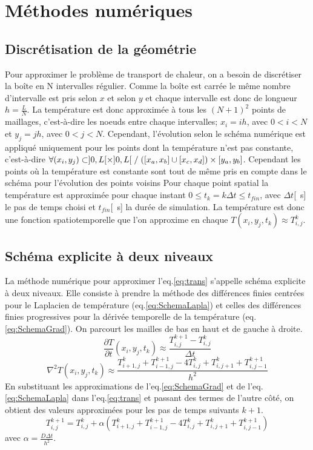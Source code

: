 \documentclass[a4paper,12pt,oneside]{article}
\def \be {\begin{equation}}
\def \ee {\end{equation}}
\begin{document}
\section{Méthodes numériques}
\subsection{Discrétisation de la géométrie}
Pour approximer le problème de transport de chaleur, on a besoin de discrétiser la boîte en N intervalles régulier. Comme la boîte est carrée le même nombre d'intervalle est pris selon $x$ et selon $y$ et chaque intervalle est donc de longueur $h=\frac{L}{N}$. La température est donc approximée à tous les $(N+1)^2$ points de maillages, c'est-à-dire les noeuds entre chaque intervalles; $x_i=ih$, avec $0<i<N$ et $y_j=jh$, avec $0<j<N$. Cependant, l'évolution selon le schéma numérique est appliqué uniquement pour les points dont la température n'est pas constante, c'est-à-dire 
$\forall (x_i,y_j)\subset ]0,L[\times]0,L[\hspace{0.1cm}/\hspace{0.1cm}([x_a,x_b]\cup[x_c,x_d])\times[y_a,y_b]$. Cependant les points où la température est constante sont tout de même pris en compte dans le schéma pour l'évolution des points voisins
Pour chaque point spatial la température est approximée pour chaque instant $0 \leq t_k=k \Delta t\leq t_{fin}$, avec $\Delta t$[\SI{}{s}] le pas de temps choisi et $t_{fin}$[\SI{}{s}] la durée de simulation.
La température est donc une fonction spatiotemporelle que l'on approxime en chaque $T(x_i,y_j,t_k)\approx T_{i,j}^{k}$.


\subsection{Schéma explicite à deux niveaux}
La méthode numérique pour approximer l'eq.\eqref{eq:trans} s'appelle schéma explicite à deux niveaux. Elle consiste à prendre la méthode des différences finies centrées pour le Laplacien de température (eq.\eqref{eq:SchemaLapla}) et celles des différences finies progressives pour la dérivée temporelle de la température (eq.\eqref{eq:SchemaGrad}). On parcourt les mailles de bas en haut et de gauche à droite.
\be
\frac{\partial T}{\partial t}(x_i,y_j,t_k)\approx\frac{T_{i,j}^{k+1}-T_{i,j}^{k}}{\Delta t}
\label{eq:SchemaGrad}
\ee
\be
\nabla^{2}T(x_i,y_j,t_k)\approx \frac{T_{i+1,j}^{k}+T_{i-1,j}^{k+1}-4T_{i,j}^{k}+T_{i,j+1}^{k}+T_{i,j-1}^{k+1}}{h^{2}}
\label{eq:SchemaLapla}
\ee
En substituant les approximations de l'eq.\eqref{eq:SchemaGrad} et de l'eq.\eqref{eq:SchemaLapla} dans l'eq.\eqref{eq:trans} et passant des termes de l'autre côté, on obtient des valeurs approximées pour les pas de temps suivants $k+1$.
\be
T_{i,j}^{k+1}=T_{i,j}^{k}+\alpha( {T_{i+1,j}^{k}+T_{i-1,j}^{k+1}-4T_{i,j}^{k}+T_{i,j+1}^{k}+T_{i,j-1}^{k+1}})
\ee
avec $\alpha= \frac{D\Delta t}{h^{2}}$.
\end{document}
